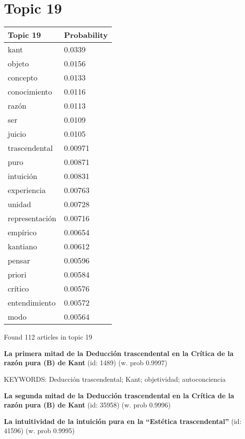 \documentclass{article}
\begin{document}
\section*{Topic 19}\vfill
\begin{tabular}{ll}
\toprule
       Topic 19 & Probability \\
\midrule
           kant &      0.0339 \\
         objeto &      0.0156 \\
       concepto &      0.0133 \\
   conocimiento &      0.0116 \\
          razón &      0.0113 \\
            ser &      0.0109 \\
         juicio &      0.0105 \\
  trascendental &     0.00971 \\
           puro &     0.00871 \\
      intuición &     0.00831 \\
    experiencia &     0.00763 \\
         unidad &     0.00728 \\
 representación &     0.00716 \\
       empírico &     0.00654 \\
       kantiano &     0.00612 \\
         pensar &     0.00596 \\
         priori &     0.00584 \\
        crítico &     0.00576 \\
  entendimiento &     0.00572 \\
           modo &     0.00564 \\
\bottomrule
\end{tabular}

\vfill
Found 112 articles in topic 19
\vfill

\textbf{La primera mitad de la Deducción trascendental en la Crítica de la razón pura (B) de Kant} (id: 1489)
 (w. prob 0.9997)


KEYWORDS:
Deducción trascendental; Kant; objetividad; autoconciencia
\vfill

\textbf{La segunda mitad de la Deducción trascendental en la Crítica de la razón pura (B) de Kant} (id: 35958)
 (w. prob 0.9996)
\vfill

\textbf{La intuitividad de la intuición pura en la “Estética trascendental”} (id: 41596)
 (w. prob 0.9995)
\end{document}
